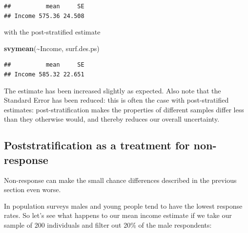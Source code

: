 \documentclass[
]{book}
\newenvironment{Shaded}{\begin{snugshade}}{\end{snugshade}}
\newcommand{\AttributeTok}[1]{\textcolor[rgb]{0.13,0.29,0.53}{#1}}
\newcommand{\DecValTok}[1]{\textcolor[rgb]{0.00,0.00,0.81}{#1}}
\newcommand{\FloatTok}[1]{\textcolor[rgb]{0.00,0.00,0.81}{#1}}
\newcommand{\FunctionTok}[1]{\textcolor[rgb]{0.13,0.29,0.53}{\textbf{#1}}}
\newcommand{\NormalTok}[1]{#1}
\newcommand{\OtherTok}[1]{\textcolor[rgb]{0.56,0.35,0.01}{#1}}
\newcommand{\SpecialCharTok}[1]{\textcolor[rgb]{0.81,0.36,0.00}{\textbf{#1}}}
\newcommand{\StringTok}[1]{\textcolor[rgb]{0.31,0.60,0.02}{#1}}
\begin{document}
\begin{verbatim}
##          mean     SE
## Income 575.36 24.508
\end{verbatim}

with the post-stratified estimate

\begin{Shaded}
\begin{Highlighting}[]
\FunctionTok{svymean}\NormalTok{(}\SpecialCharTok{\textasciitilde{}}\NormalTok{Income, surf.des.ps)}
\end{Highlighting}
\end{Shaded}

\begin{verbatim}
##          mean     SE
## Income 585.32 22.651
\end{verbatim}

The estimate has been increased slightly as expected. Also note that
the Standard Error has been reduced: this is often the case with
post-stratified estimates: post-stratification makes the properties
of different samples differ less than they otherwise would, and thereby
reduces our overall uncertainty.

\subsection*{Poststratification as a treatment for non-response}\label{poststratification-as-a-treatment-for-non-response}

Non-response can make the small chance differences described in the previous section even worse.

In population surveys males and young people tend to have the lowest response rates.
So let's see what happens to our mean income estimate if we take our sample of 200 individuals
and filter out 20\% of the male respondents:

\begin{Shaded}
\end{Shaded}
\end{document}
